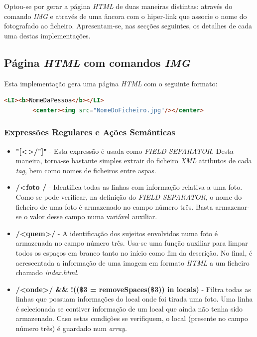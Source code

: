 \documentclass{article}
\begin{document}
Optou-se por gerar a página \emph{HTML} de duas maneiras distintas: através do comando \emph{IMG} e através de uma âncora com o hiper-link que associe o nome do fotografado ao ficheiro. Apresentam-se, nas secções seguintes, os detalhes de cada uma destas implementações.


\subsection{Página \emph{HTML} com comandos \emph{IMG}}

Esta implementação gera uma página \emph{HTML} com o seguinte formato:

\begin{lstlisting}[language=html]
    <LI><b>NomeDaPessoa</b></LI>
        <center><img src="NomeDoFicheiro.jpg"/></center>
\end{lstlisting}


\subsubsection{Expressões Regulares e Ações Semânticas}

\begin{itemize}
    \item \textbf{"[\textless\textgreater/"]"} - Esta expressão é usada como \emph{FIELD SEPARATOR}. Desta maneira, torna-se bastante simples extrair do ficheiro \emph{XML} atributos de cada \emph{tag}, bem como nomes de ficheiros entre aspas. 
    \item \textbf{/\textless foto / } - Identifica todas as linhas com informação relativa a uma foto. Como se pode verificar, na definição do \emph{FIELD SEPARATOR}, o nome do ficheiro de uma foto é armazenado no campo número três. Basta armazenar-se o valor desse campo numa variável auxiliar.
    \item \textbf{/\textless quem\textgreater/} - A identificação dos sujeitos envolvidos numa foto é armazenada no campo número três. Usa-se uma função auxiliar para limpar todos os espaços em branco tanto no início como fim da descrição. No final, é acrescentada a informação de uma imagem em formato \emph{HTML} a um ficheiro chamado \emph{index.html}.
    \item \textbf{/\textless onde\textgreater/ && !((\$3 = removeSpaces(\$3)) in locals)} - Filtra todas as linhas que possuam informações do local onde foi tirada uma foto. Uma linha é selecionada se contiver informação de um local que ainda não tenha sido armazenado. Caso estas condições se verifiquem, o local (presente no campo número três) é guardado num \emph{array}. 
\end{itemize}
\end{document}
